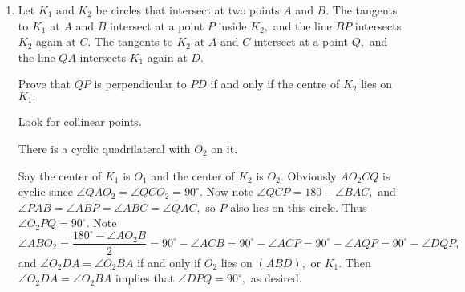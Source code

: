 \begin{enumerate}
\begin{solu}
\begin{addsol}
{Now note
\[\angle AQB=\angle BAP+\angle ABP=180^{\circ}-\angle APB=\angle BPR=\angle BRP,\]
so $ABRQ$ is cyclic.

Now reflect $P$ about the midpoint of $AB$ to get $P'.$ Then note
\[\angle PQR=\angle P'QR=\angle P'AR=\angle P'AB+\angle BAR=\angle ABR+\angle BAP=\angle BPR,\]
so $BP$ is tangent to $(PQR),$ as desired.}
    \end{addsol}
    \end{solu}
    
    \item Let $K_1$ and $K_2$ be circles that intersect at two points $A$ and $B.$ The tangents to $K_1$ at $A$ and $B$ intersect at a point $P$ inside $K_2,$ and the line $BP$ intersects $K_2$ again at $C.$ The tangents to $K_2$ at $A$ and $C$ intersect at a point $Q,$ and the line $QA$ intersects $K_1$ again at $D.$

Prove that $QP$ is perpendicular to $PD$ if and only if the centre of $K_2$ lies on $K_1.$
\begin{hint}
\begin{addhint}
{Look for collinear points.}
\end{addhint}
\begin{addhint}
{There is a cyclic quadrilateral with $O_2$ on it.}
\end{addhint}
\end{hint}
\begin{solu}
\begin{addsol}
{Say the center of $K_1$ is $O_1$ and the center of $K_2$ is $O_2.$ Obviously $AO_2CQ$ is cyclic since $\angle QAO_2=\angle QCO_2=90^{\circ}.$ Now note $\angle QCP=180-\angle BAC,$ and $\angle PAB=\angle ABP=\angle ABC=\angle QAC,$ so $P$ also lies on this circle. Thus $\angle O_2PQ=90^{\circ}.$ Note
\[\angle ABO_2=\frac{180^{\circ}-\angle AO_2B}{2}=90^{\circ}-\angle ACB=90^{\circ}-\angle ACP=90^{\circ}-\angle AQP=90^{\circ}-\angle DQP,\]
and $\angle O_2DA=\angle O_2BA$ if and only if $O_2$ lies on $(ABD),$ or $K_1.$ Then $\angle O_2DA=\angle O_2BA$ implies that $\angle DPQ=90^{\circ},$ as desired.}
\end{addsol}
\end{solu}
    

\end{enumerate}
